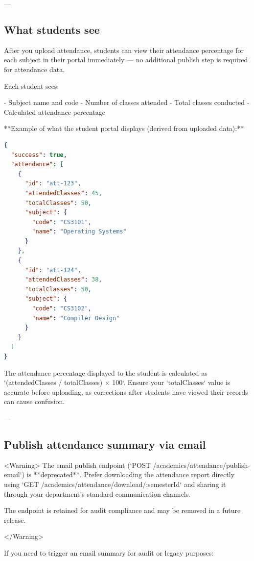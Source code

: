 ---

\subsection{What students see}

After you upload attendance, students can view their attendance percentage for
each subject in their portal immediately — no additional publish step is
required for attendance data.

Each student sees:

- Subject name and code
- Number of classes attended
- Total classes conducted
- Calculated attendance percentage

**Example of what the student portal displays (derived from uploaded data):**

\begin{lstlisting}[language=json]
{
  "success": true,
  "attendance": [
    {
      "id": "att-123",
      "attendedClasses": 45,
      "totalClasses": 50,
      "subject": {
        "code": "CS3101",
        "name": "Operating Systems"
      }
    },
    {
      "id": "att-124",
      "attendedClasses": 38,
      "totalClasses": 50,
      "subject": {
        "code": "CS3102",
        "name": "Compiler Design"
      }
    }
  ]
}

\end{lstlisting}

The attendance percentage displayed to the student is calculated as
`(attendedClasses / totalClasses) × 100`. Ensure your `totalClasses` value is
accurate before uploading, as corrections after students have viewed their
records can cause confusion.

---

\subsection{Publish attendance summary via email}

<Warning>
  The email publish endpoint (`POST /academics/attendance/publish-email`) is
  **deprecated**. Prefer downloading the attendance report directly using
  `GET /academics/attendance/download/:semesterId` and sharing it through your
  department's standard communication channels.

The endpoint is retained for audit compliance and may be removed in a future
release.

</Warning>

If you need to trigger an email summary for audit or legacy purposes:

